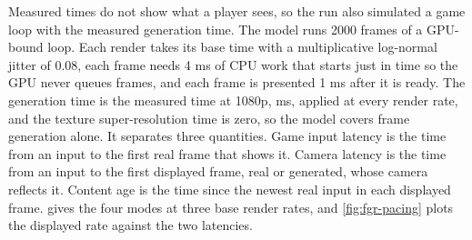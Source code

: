 Measured times do not show what a player sees, so the run also simulated a game loop with the measured generation time. The model runs 2000 frames of a GPU-bound loop. Each render takes its base time with a multiplicative log-normal jitter of 0.08, each frame needs 4 ms of CPU work that starts just in time so the GPU never queues frames, and each frame is presented 1 ms after it is ready. The generation time is the measured  time at 1080p,  ms, applied at every render rate, and the texture super-resolution time is zero, so the model covers frame generation alone. It separates three quantities. Game input latency is the time from an input to the first real frame that shows it. Camera latency is the time from an input to the first displayed frame, real or generated, whose camera reflects it. Content age is the time since the newest real input in each displayed frame.  gives the four modes at three base render rates, and \cref{fig:fgr-pacing} plots the displayed rate against the two latencies.


